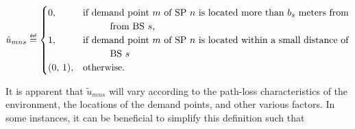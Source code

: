\documentclass[12pt,dvipsnames]{report}
\newif\ifisdoublespacing
\newcommand\defeq{\mathrel{\overset{\makebox[0pt]{\mbox{\normalfont\tiny\sffamily def}}}{=}}}
\newcommand\tab[1][1cm]{\hspace*{#1}}
\begin{document}
\ifisdoublespacing
\begin{singlespacing}
\begin{equation} \label{eq:umns}
\tilde{u}_{mns} \defeq
	\begin{cases}
		0,& \text{if demand point $m$ of SP $n$ is located more than $b_s$ meters from}\\
		& \text{\tab from BS $s$;}\\
		\\
		1,& \text{if demand point $m$ of SP $n$ is located within a small distance of}\\
		& \text{\tab BS $s$;}\\
		\\
		(0,\, 1),& \text{otherwise.}
	\end{cases}
\end{equation}
\end{singlespacing}
\else
\begin{equation} \label{eq:umns}
\tilde{u}_{mns} \defeq
	\begin{cases}
		0,& \text{if demand point $m$ of SP $n$ is located more than $b_s$ meters from}\\
		& \text{\tab from BS $s$,}\\
		1,& \text{if demand point $m$ of SP $n$ is located within a small distance of}\\
		& \text{\tab BS $s$}\\
		(0,\, 1),& \text{otherwise.}
	\end{cases}
\end{equation}
\fi

It is apparent that $\tilde{u}_{mns}$ will vary according to the path-loss characteristics of the environment, the locations of the demand points, and other various factors.  In some instances, it can be beneficial to simplify this definition such that
\end{document}
